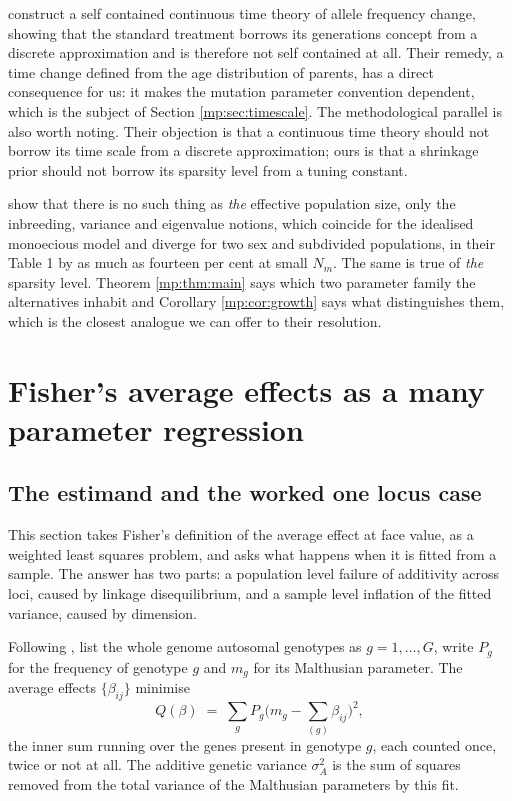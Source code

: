 \citet{mp:hossjer2025} construct a self contained continuous time theory of allele
frequency change, showing that the standard treatment borrows its generations concept from a
discrete approximation and is therefore not self contained at all. Their remedy, a time change
defined from the age distribution of parents, has a direct consequence for us: it makes the
mutation parameter convention dependent, which is the subject of Section \ref{mp:sec:timescale}.
The methodological parallel is also worth noting. Their objection is that a continuous time
theory should not borrow its time scale from a discrete approximation; ours is that a
shrinkage prior should not borrow its sparsity level from a tuning constant.

\citet{mp:ewenshossjer2025} show that there is no such thing as \emph{the} effective population
size, only the inbreeding, variance and eigenvalue notions, which coincide for the idealised
monoecious model and diverge for two sex and subdivided populations, in their Table 1 by as
much as fourteen per cent at small $N_m$. The same is true of \emph{the} sparsity level.
Theorem \ref{mp:thm:main} says which two parameter family the alternatives inhabit and Corollary
\ref{mp:cor:growth} says what distinguishes them, which is the closest analogue we can offer to
their resolution.

\section{Fisher's average effects as a many parameter regression}
\label{mp:sec:avgeff}

\subsection{The estimand and the worked one locus case}

This section takes Fisher's definition of the average effect at face value, as a weighted
least squares problem, and asks what happens when it is fitted from a sample. The answer has
two parts: a population level failure of additivity across loci, caused by linkage
disequilibrium, and a sample level inflation of the fitted variance, caused by dimension.

Following \citet{mp:ewens2024}, list the whole genome autosomal genotypes as $g=1,\dots,G$, write
$P_g$ for the frequency of genotype $g$ and $m_g$ for its Malthusian parameter. The average
effects $\{\beta_{ij}\}$ minimise
\begin{equation}
Q(\beta) \;=\; \sum_{g} P_g\Big(m_g - \sum_{(g)}\beta_{ij}\Big)^2 ,
\label{mp:eq:ewens10}
\end{equation}
the inner sum running over the genes present in genotype $g$, each counted once, twice or
not at all. The additive genetic variance $\sigma_A^2$ is the sum of squares removed from
the total variance of the Malthusian parameters by this fit.


